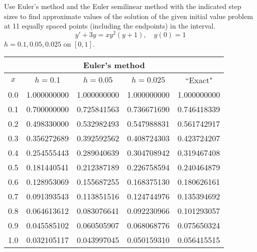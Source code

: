 \documentclass{ximera}
\begin{document}
\begin{problem}\label{exer:3.1.20} Use Euler's method and the Euler semilinear method
with the indicated  step sizes to find approximate values
of the solution of the given initial value problem at 11 equally
spaced points (including the endpoints) in the interval.
$$y'+3y=xy^2(y+1),\quad y(0)=1$$
$h=0.1,0.05,0.025$ on $[0,1]$.



\begin{solution}
    {\small
\begin{tabular}{|c|r|r|r|r|}
\hline
\multicolumn{5}{|c|}{Euler's method}\\\hline
\multicolumn{1}{|c|}{$x$}&
\multicolumn{1}{|c|}{$h=0.1$}&
\multicolumn{1}{|c|}{$h=0.05$}&
\multicolumn{1}{|c|}{$h=0.025$}&
\multicolumn{1}{|c|}{``Exact"}\\ \hline
0.0 & 1.000000000 & 1.000000000 & 1.000000000 & 1.000000000 \\
0.1 & 0.700000000 & 0.725841563 & 0.736671690 & 0.746418339 \\
0.2 & 0.498330000 & 0.532982493 & 0.547988831 & 0.561742917 \\
0.3 & 0.356272689 & 0.392592562 & 0.408724303 & 0.423724207 \\
0.4 & 0.254555443 & 0.289040639 & 0.304708942 & 0.319467408 \\
0.5 & 0.181440541 & 0.212387189 & 0.226758594 & 0.240464879 \\
0.6 & 0.128953069 & 0.155687255 & 0.168375130 & 0.180626161 \\
0.7 & 0.091393543 & 0.113851516 & 0.124744976 & 0.135394692 \\
0.8 & 0.064613612 & 0.083076641 & 0.092230966 & 0.101293057 \\
0.9 & 0.045585102 & 0.060505907 & 0.068068776 & 0.075650324 \\
1.0 & 0.032105117 & 0.043997045 & 0.050159310 & 0.056415515 \\
\hline
\end{tabular}}
\medskip


\end{solution}
\end{problem}
\end{document}
